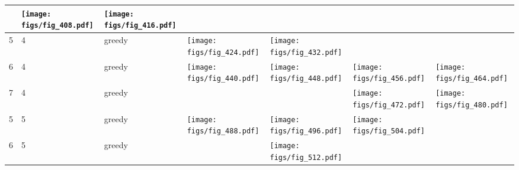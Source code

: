 \documentclass[oneside,canadian,landscape]{article}
\begin{document}
\begin{center}
\begin{longtable}{|l|l|l||l|l|l|l|}
&\begin{minipage}{3.5cm}
\texttt{[image: figs/fig\_408.pdf]}
\end{minipage}
&\begin{minipage}{3.5cm}
\texttt{[image: figs/fig\_416.pdf]}
\end{minipage}
\\ \hline
5&4&greedy&\begin{minipage}{3.5cm}
\texttt{[image: figs/fig\_424.pdf]}
\end{minipage}
&\begin{minipage}{3.5cm}
\texttt{[image: figs/fig\_432.pdf]}
\end{minipage}
&&\\ \hline
6&4&greedy&\begin{minipage}{3.5cm}
\texttt{[image: figs/fig\_440.pdf]}
\end{minipage}
&\begin{minipage}{3.5cm}
\texttt{[image: figs/fig\_448.pdf]}
\end{minipage}
&\begin{minipage}{3.5cm}
\texttt{[image: figs/fig\_456.pdf]}
\end{minipage}
&\begin{minipage}{3.5cm}
\texttt{[image: figs/fig\_464.pdf]}
\end{minipage}
\\ \hline
7&4&greedy&&&\begin{minipage}{3.5cm}
\texttt{[image: figs/fig\_472.pdf]}
\end{minipage}
&\begin{minipage}{3.5cm}
\texttt{[image: figs/fig\_480.pdf]}
\end{minipage}
\\ \hline
5&5&greedy&\begin{minipage}{3.5cm}
\texttt{[image: figs/fig\_488.pdf]}
\end{minipage}
&\begin{minipage}{3.5cm}
\texttt{[image: figs/fig\_496.pdf]}
\end{minipage}
&\begin{minipage}{3.5cm}
\texttt{[image: figs/fig\_504.pdf]}
\end{minipage}
&\\ \hline
6&5&greedy&&\begin{minipage}{3.5cm}
\texttt{[image: figs/fig\_512.pdf]}

\end{minipage}
\end{longtable}
\end{center}
\end{document}
